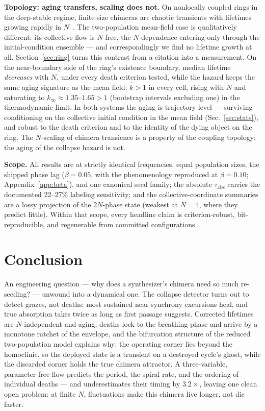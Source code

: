 \documentclass[pdflatex,sn-mathphys,Numbered]{sn-jnl}
\begin{document}
\textbf{Topology: aging transfers, scaling does not.} On nonlocally coupled rings
in the deep-stable regime, finite-size chimeras are chaotic transients with
lifetimes growing rapidly in $N$~\cite{wo2011}. The two-population mean-field case
is qualitatively different: its collective flow is $N$-free, the $N$-dependence
entering only through the initial-condition ensemble --- and correspondingly we
find no lifetime growth at all. Section~\ref{sec:ring} turns this contrast from a
citation into a measurement. On the near-boundary side of the ring's existence
boundary, median lifetime \emph{decreases} with $N$, under every death criterion
tested, while the hazard keeps the same aging signature as the mean field:
$\hat k > 1$ in every cell, rising with $N$ and saturating to
$k_\infty \approx 1.35$--$1.65 > 1$ (bootstrap intervals excluding one) in the
thermodynamic limit. In both systems the aging is trajectory-level --- surviving
conditioning on the collective initial condition in the mean field
(Sec.~\ref{sec:stats}), and robust to the death criterion and to the identity of
the dying object on the ring. The $N$-scaling of chimera transience is a property
of the coupling topology; the aging of the collapse hazard is not.

\textbf{Scope.} All results are at strictly identical frequencies, equal population
sizes, the shipped phase lag ($\beta = 0.05$, with the phenomenology reproduced at
$\beta = 0.10$; Appendix~\ref{app:beta}), and one canonical seed family; the absolute
$\tau_{\mathrm{abs}}$ carries the documented 22--27\% labeling sensitivity; and the
collective-coordinate summaries are a lossy projection of the $2N$-phase state
(weakest at $N = 4$, where they predict little). Within that scope, every headline
claim is criterion-robust, bit-reproducible, and regenerable from committed
configurations.

\section{Conclusion}\label{sec:conclusion}

An engineering question --- why does a synthesizer's chimera need so much
re-seeding? --- unwound into a dynamical one. The collapse detector turns out to
detect grazes, not deaths: most sustained near-synchrony excursions heal, and true
absorption takes twice as long as first passage suggests. Corrected lifetimes are
$N$-independent and aging, deaths lock to the breathing phase and arrive by a
monotone ratchet of the envelope, and the bifurcation structure of the reduced
two-population model explains why: the operating corner lies beyond the homoclinic,
so the deployed state is a transient on a destroyed cycle's ghost, while the
discarded corner holds the true chimera attractor. A three-variable, parameter-free
flow predicts the period, the spiral rate, and the ordering of individual deaths
--- and underestimates their timing by $3.2\times$, leaving one clean open problem:
at finite $N$, fluctuations make this chimera live longer, not die faster.
\end{document}
